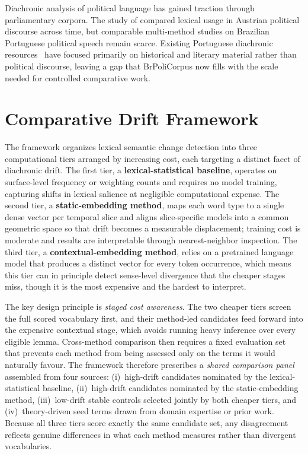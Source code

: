 \documentclass[12pt]{article}
\begin{document}
Diachronic analysis of political language has gained traction through
parliamentary corpora. The study of \cite{hofmann-etal-2020-comparing}
compared lexical usage in Austrian political discourse across time, but
comparable multi-method studies on Brazilian Portuguese political speech remain
scarce. Existing Portuguese diachronic
resources~\cite{osorio-cardoso-2025-historical} have focused primarily on
historical and literary material rather than political discourse, leaving a
gap that BrPoliCorpus \cite{lima-lopes-2025-brpolicorpus} now fills with the
scale needed for controlled comparative work.

\section{Comparative Drift Framework}
\label{sec:framework}

The framework organizes lexical semantic change detection into three
computational tiers arranged by increasing cost, each targeting a distinct
facet of diachronic drift. The first tier, a \textbf{lexical-statistical
baseline}, operates on surface-level frequency or weighting counts and
requires no model training, capturing shifts in lexical salience at negligible
computational expense. The second tier, a \textbf{static-embedding method},
maps each word type to a single dense vector per temporal slice and aligns
slice-specific models into a common geometric space so that drift becomes a
measurable displacement; training cost is moderate and results are
interpretable through nearest-neighbor inspection. The third tier, a
\textbf{contextual-embedding method}, relies on a pretrained language model
that produces a distinct vector for every token occurrence, which means this
tier can in principle detect sense-level divergence that the cheaper stages
miss, though it is the most expensive and the hardest to interpret.

The key design principle is \emph{staged cost awareness}. The two cheaper
tiers screen the full scored vocabulary first, and their method-led candidates
feed forward into the expensive contextual stage, which avoids running heavy
inference over every eligible lemma. Cross-method comparison then requires a
fixed evaluation set that prevents each method from being assessed only on the
terms it would naturally favour. The framework therefore prescribes a
\emph{shared comparison panel} assembled from four sources: (i)~high-drift
candidates nominated by the lexical-statistical baseline, (ii)~high-drift
candidates nominated by the static-embedding method, (iii)~low-drift stable
controls selected jointly by both cheaper tiers, and (iv)~theory-driven seed
terms drawn from domain expertise or prior work. Because all three tiers score
exactly the same candidate set, any disagreement reflects genuine differences
in what each method measures rather than divergent vocabularies.
\end{document}
